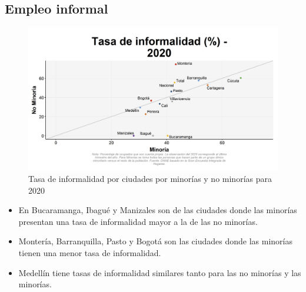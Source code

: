     \subsection{Empleo informal}

    \begin{figure}[H]
        \caption{Tasa de informalidad por ciudades por minorías y no minorías para 2020 \label{map_result_2} }
        \begin{center}
        \includegraphics[width=\textwidth,keepaspectratio]{img/var_67_scatter.png}
        \end{center}
    \end{figure}
            \begin{itemize}
                \item En Bucaramanga, Ibagué y Manizales son de las ciudades donde las minorías presentan una tasa de informalidad mayor a la de las no minorías.
                \item Montería, Barranquilla, Pasto y Bogotá son las ciudades donde las minorías tienen una menor tasa de informalidad.
                \item Medellín tiene tasas de informalidad similares tanto para las no minorías y las minorías.
                \end{itemize}

